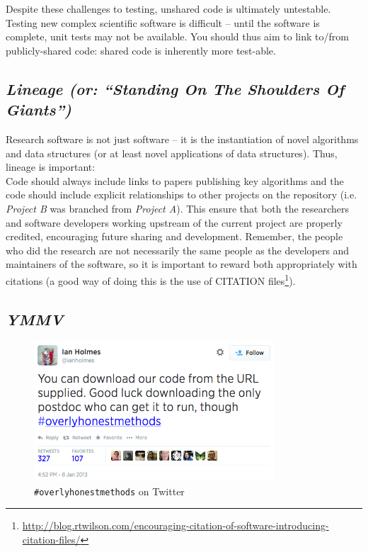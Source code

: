 \documentclass[a4paper,11pt]{article}
\begin{document}
 Despite these
challenges to testing, unshared code is ultimately untestable.
Testing new complex scientific software is difficult -- until the
software is complete, unit tests may not be available. You should thus
aim to link to/from publicly-shared code: shared code is inherently more
test-able.

\subsection{{\emph{Lineage (or: ``Standing On The Shoulders Of Giants'')}}}

Research software is not just software -- it is the instantiation of
novel algorithms and data structures (or at least novel applications
of data structures). Thus, lineage is important:\\

 Code should always
include links to papers publishing key algorithms and the code should
include explicit relationships to other projects on the repository
(i.e. {\emph{Project B}} was branched from {\emph{Project A}}). This
ensure that both the researchers and software developers working
upstream of the current project are properly credited, encouraging
future sharing and development. Remember, the people who did the
research are not necessarily the same people as the developers and
maintainers of the software, so it is important to reward both
appropriately with citations (a good way of doing this is the use of
CITATION
files\footnote{\url{http://blog.rtwilson.com/encouraging-citation-of-software-introducing-citation-files/}}).

\subsection{{\emph{YMMV}}}

\begin{figure}[!ht]
\centering
\includegraphics[width=0.8\textwidth]{images/overlyhonesttweet.png}
\caption{{\texttt{\#overlyhonestmethods}} on Twitter}
\label{fig:overlyhonestmethod} 
\end{figure}
\end{document}
